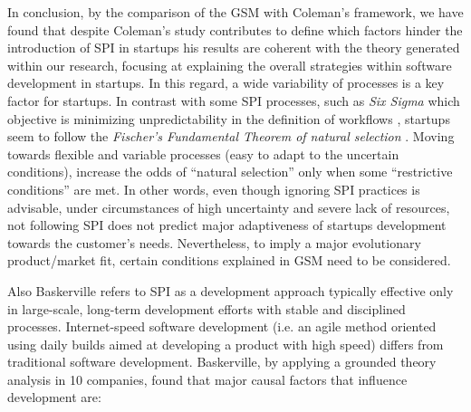 \documentclass[10pt,journal,letterpaper,compsoc]{IEEEtran}
\begin{document}
In conclusion, by the comparison of the GSM with Coleman's framework, we have
found that despite Coleman's study contributes to define which factors hinder
the introduction of SPI in startups  %
his results are coherent with the theory generated within our research, focusing
at explaining the overall strategies within software development in startups.
In this regard, a wide variability of processes is a key factor for startups.   
In contrast with some SPI processes, such as \textit{Six Sigma} which objective 
is minimizing unpredictability in the definition of workflows \cite{Sixsigma}, 
startups seem to follow the \textit{Fischer's Fundamental Theorem of natural   
selection} \cite{Fisher}.
Moving towards flexible and variable processes (easy  to adapt to the uncertain
conditions), increase the odds of ``natural  selection'' only when some
``restrictive conditions'' are met. In other words, even though ignoring SPI
practices is advisable, under circumstances of high uncertainty and severe lack
of resources, %
not following SPI does not predict major adaptiveness of startups development 
towards the customer's needs. Nevertheless, to imply a major evolutionary 
product/market fit, certain conditions explained in GSM need to be considered.



Also Baskerville \cite{Internet} refers to SPI as a development approach
typically effective only in large-scale, long-term development efforts with
stable and disciplined processes. Internet-speed software development (i.e. an
agile method oriented using daily builds aimed at developing a product with high
speed) differs from traditional software development. Baskerville, by applying a
grounded theory analysis in 10 companies, found that major causal factors that
influence development are:
\end{document}
